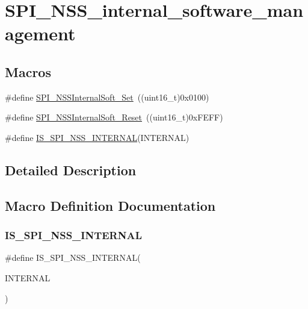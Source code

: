 \hypertarget{group___s_p_i___n_s_s__internal__software__management}{}\section{S\+P\+I\+\_\+\+N\+S\+S\+\_\+internal\+\_\+software\+\_\+management}
\label{group___s_p_i___n_s_s__internal__software__management}
\subsection*{Macros}
\begin{DoxyCompactItemize}
\item 
\#define \mbox{\hyperlink{group___s_p_i___n_s_s__internal__software__management_ga6b2102816167d12140648dba49a192a7}{S\+P\+I\+\_\+\+N\+S\+S\+Internal\+Soft\+\_\+\+Set}}~((uint16\+\_\+t)0x0100)
\item 
\#define \mbox{\hyperlink{group___s_p_i___n_s_s__internal__software__management_ga292ec7bc0cd362d61b3b5eed620522c2}{S\+P\+I\+\_\+\+N\+S\+S\+Internal\+Soft\+\_\+\+Reset}}~((uint16\+\_\+t)0x\+F\+E\+F\+F)
\item 
\#define \mbox{\hyperlink{group___s_p_i___n_s_s__internal__software__management_ga7036de442206fb8b365528c115345b36}{I\+S\+\_\+\+S\+P\+I\+\_\+\+N\+S\+S\+\_\+\+I\+N\+T\+E\+R\+N\+AL}}(I\+N\+T\+E\+R\+N\+AL)
\end{DoxyCompactItemize}


\subsection{Detailed Description}


\subsection{Macro Definition Documentation}
\mbox{\label{group___s_p_i___n_s_s__internal__software__management_ga7036de442206fb8b365528c115345b36}} 
\subsubsection{\texorpdfstring{IS\_SPI\_NSS\_INTERNAL}{IS\_SPI\_NSS\_INTERNAL}}
{\footnotesize\ttfamily \#define I\+S\+\_\+\+S\+P\+I\+\_\+\+N\+S\+S\+\_\+\+I\+N\+T\+E\+R\+N\+AL(\begin{DoxyParamCaption}\item[{}]{I\+N\+T\+E\+R\+N\+AL }\end{DoxyParamCaption})}

